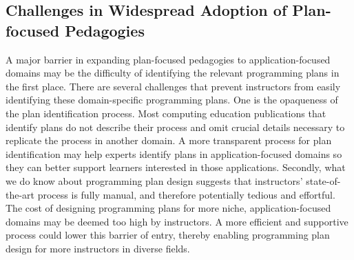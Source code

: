 \subsection{Challenges in Widespread Adoption of Plan-focused Pedagogies}
A major barrier in expanding plan-focused pedagogies to application-focused domains may be the difficulty of identifying the relevant programming plans in the first place. There are several challenges that prevent instructors from easily identifying these domain-specific programming plans.
One is the opaqueness of the plan identification process. Most computing education publications that identify plans 
do not describe their process and omit crucial details necessary to replicate the process in another domain. A more transparent process for plan identification may help experts identify plans in application-focused domains so they can better support learners interested in those applications. 
Secondly, what we do know about programming plan design suggests that instructors' state-of-the-art process is fully manual, and therefore potentially tedious and effortful. The cost of designing programming plans for more niche, application-focused domains may be deemed too high by instructors. A more efficient and supportive process could lower this barrier of entry, thereby enabling programming plan design for more instructors in diverse fields. %

